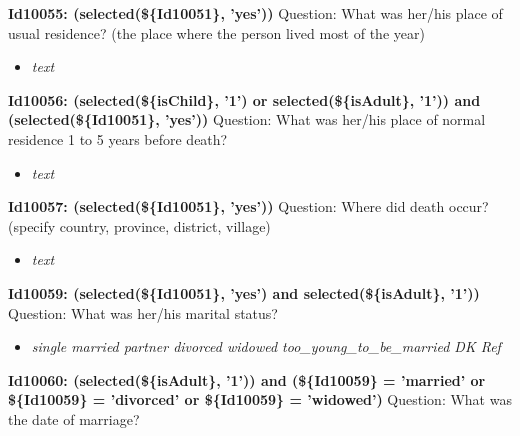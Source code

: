 \documentclass{article}%
\begin{document}
\textbf{Id10055: (selected(\$\{Id10051\}, 'yes'))\newline%
}%
Question: What was her/his place of usual residence? (the place where the person lived most of the year)\newline%
%
\begin{itemize}%
\item%
\textit{text\newline%
}%
\end{itemize}%
\textbf{Id10056: (selected(\$\{isChild\}, '1') or selected(\$\{isAdult\}, '1')) and (selected(\$\{Id10051\}, 'yes'))\newline%
}%
Question: What was her/his place of normal residence 1 to 5 years before death?\newline%
%
\begin{itemize}%
\item%
\textit{text\newline%
}%
\end{itemize}%
\textbf{Id10057: (selected(\$\{Id10051\}, 'yes'))\newline%
}%
Question: Where did death occur? (specify country, province, district, village)\newline%
%
\begin{itemize}%
\item%
\textit{text\newline%
}%
\end{itemize}%
\textbf{Id10059: (selected(\$\{Id10051\}, 'yes') and selected(\$\{isAdult\}, '1'))\newline%
}%
Question: What was her/his marital status?\newline%
%
\begin{itemize}%
\item%
\textit{single\newline%
 married\newline%
 partner\newline%
 divorced\newline%
 widowed\newline%
 too\_young\_to\_be\_married\newline%
 DK\newline%
 Ref\newline%
}%
\end{itemize}%
\textbf{Id10060: (selected(\$\{isAdult\}, '1')) and (\$\{Id10059\} = 'married' or \$\{Id10059\} = 'divorced' or \$\{Id10059\} = 'widowed')\newline%
}%
Question: What was the date of marriage?\newline%
\end{document}
